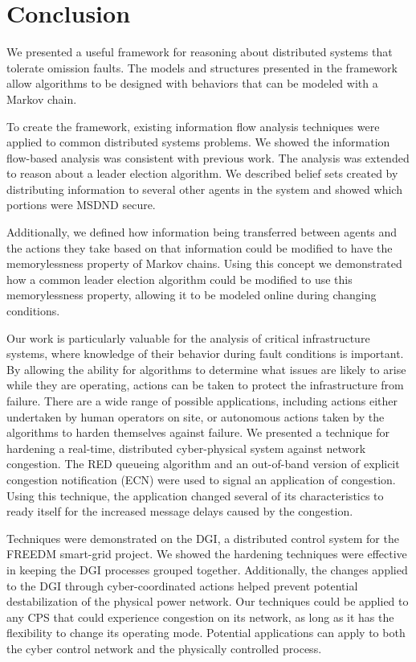 
\chapter{Conclusion}

We presented a useful framework for reasoning about distributed systems that tolerate omission faults.
The models and structures presented in the framework allow algorithms to be designed with behaviors that can be modeled with a Markov chain.

To create the framework, existing information flow analysis techniques were applied to common distributed systems problems.
We showed the information flow-based analysis was consistent with previous work.
The analysis was extended to reason about a leader election algorithm.
We described belief sets created by distributing information to several other agents in the system and showed which portions were MSDND secure.

Additionally, we defined how information being transferred between agents and the actions they take based on that information could be modified to have the memorylessness property of Markov chains.
Using this concept we demonstrated how a common leader election algorithm could be modified to use this memorylessness property, allowing it to be modeled online during changing conditions.

Our work is particularly valuable for the analysis of critical infrastructure systems, where knowledge of their behavior during fault conditions is important.
By allowing the ability for algorithms to determine what issues are likely to arise while they are operating, actions can be taken to protect the infrastructure from failure.
There are a wide range of possible applications, including actions either undertaken by human operators on site, or autonomous actions taken by the algorithms to harden themselves against failure.
We presented a technique for hardening a real-time, distributed cyber-physical system against network congestion.
The \ac{RED} queueing algorithm and an out-of-band version of explicit congestion notification (ECN) were used to signal an application of congestion.
Using this technique, the application changed several of its characteristics to ready itself for the increased message delays caused by the congestion.

Techniques were demonstrated on the \ac{DGI}, a distributed control system for the \ac{FREEDM} smart-grid project.
We showed the hardening techniques were effective in keeping the \ac{DGI} processes grouped together.
Additionally, the changes applied to the \ac{DGI} through cyber-coordinated actions helped prevent potential destabilization of the physical power network.
Our techniques could be applied to any \ac{CPS} that could experience congestion on its network, as long as it has the flexibility to change its operating mode.
Potential applications can apply to both the cyber control network and the physically controlled process.
